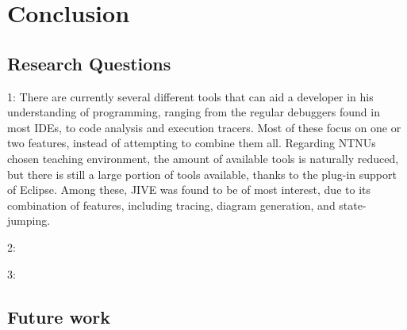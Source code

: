 \section{Conclusion}\label{conclusion}

\subsection{Research Questions}\label{conclusionRQs}
1: There are currently several different tools that can aid a developer in his understanding of programming, ranging from the regular debuggers found in most IDEs, to code analysis and execution tracers.
Most of these focus on one or two features, instead of attempting to combine them all.
Regarding NTNUs chosen teaching environment, the amount of available tools is naturally reduced, but there is still a large portion of tools available, thanks to the plug-in support of Eclipse.
Among these, JIVE was found to be of most interest, due to its combination of features, including tracing, diagram generation, and state-jumping.

2:

3:
\subsection{Future work}\label{conclusionFuture}